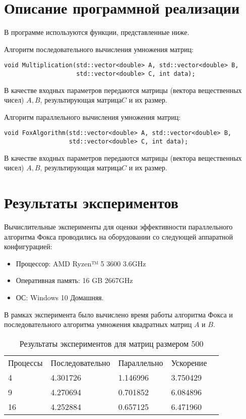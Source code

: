 \documentclass{report}
\begin{document}
\section*{Описание программной реализации}
В программе используются функции, представленные ниже.
\par Алгоритм последовательного вычисления умножения матриц:
\begin{lstlisting}
void Multiplication(std::vector<double> A, std::vector<double> B,
                    std::vector<double> C, int data);

\end{lstlisting}
\par В качестве входных параметров передаются матрицы (вектора вещественных чисел) {\itshape $A, B$}, результирующая матрица{\itshape $C$} и их размер. 
\par Алгоритм параллельного вычисления умножения матриц:
\begin{lstlisting}
void FoxAlgorithm(std::vector<double> A, std::vector<double> B,
                  std::vector<double> C, int data);
\end{lstlisting}
\par В качестве входных параметров передаются матрицы (вектора вещественных чисел) {\itshape $A, B$}, результирующая матрица{\itshape $C$} и их размер.
\newpage

\section*{Результаты экспериментов}
Вычислительные эксперименты для оценки эффективности параллельного алгоритма Фокса проводились на оборудовании со следующей аппаратной конфигурацией:

\begin{itemize}
\item Процессор: AMD Ryzen™ 5 3600 3.6GHz
\item Оперативная память: 16 GB 2667GHz
\item ОС: Windows 10 Домашняя.
\end{itemize}

\par В рамках эксперимента было вычислено время работы алгоритма Фокса
и последовательного алгоритма умножения квадратных матриц {\itshape $A$} и {\itshape $B$}.
\begin{table}[!h]
\caption{Результаты экспериментов для матриц размером 500}
\centering
\begin{tabular}{lllll}
Процессы & Последовательно & Параллельно & Ускорение  \\
4        & 4.301726        & 1.146996    & 3.750429       \\
9        & 4.270694        & 0.701852    & 6.084896       \\
16       & 4.252884        & 0.657125    & 6.471960       
\end{tabular}
\end{table}
\end{document}
